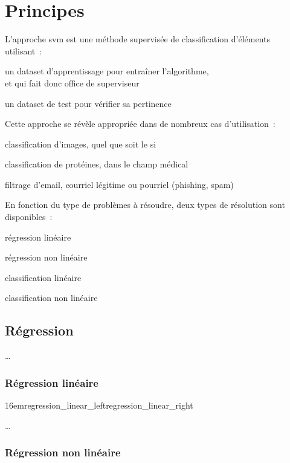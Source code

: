 \section{Principes}

L’approche \gls{svm} est une méthode supervisée de classification d’éléments
utilisant :
\begin{enum}
\item{un \gls{dataset} d’apprentissage pour entraîner l’algorithme,\\
et qui fait donc office de superviseur}
\item{un \gls{dataset} de test pour vérifier sa pertinence}
\end{enum}

Cette approche se révèle appropriée dans de nombreux cas d’utilisation :
\begin{itmz}
\item{classification d’images, quel que soit le \gls{si}}
\item{classification de protéines, dans le champ médical}
\item{filtrage d’email, courriel légitime ou pourriel (phishing, spam)}
\end{itmz}

En fonction du type de problèmes à résoudre,
deux types de résolution sont disponibles :
\begin{itmz}
\item{régression linéaire}
\item{régression non linéaire}
\item{classification linéaire}
\item{classification non linéaire}
\end{itmz}

\subsection{Régression}

…

\subsubsection{Régression linéaire}

{16em}{regression_linear_left}{regression_linear_right}

…

\subsubsection{Régression non linéaire}

